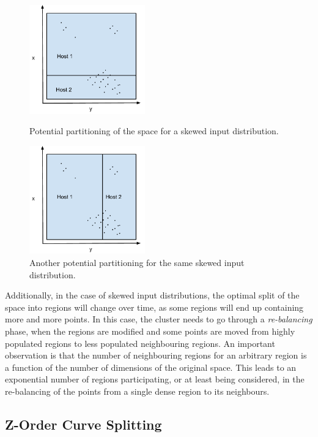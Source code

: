 \documentclass[11pt,a4paper]{globis-book}
\begin{document}
\begin{figure}[t]
\centering
\parbox{5cm}{
    \includegraphics[width=5cm]{images/geometric-bad-split}
    \caption{Potential partitioning of the space for a skewed input distribution.}
    \label{fig:geometric-bad-split}}
\qquad
\begin{minipage}{5cm}
    \includegraphics[width=5cm]{images/geometric-bad-split-2}
    \caption{Another potential partitioning for the same skewed input distribution.}
    \label{fig:geometric-bad-split-2}
\end{minipage}
\end{figure}
        
Additionally, in the case of skewed input distributions, the optimal split of the space into regions will change over time, as some regions will end up containing more and more points. In this case, the cluster needs to go through a \textit{re-balancing} phase, when the regions are modified and some points are moved from highly populated regions to less populated neighbouring regions. An important observation is that the number of neighbouring regions for an arbitrary region is a function of the number of dimensions of the original space. This leads to an exponential number of regions participating, or at least being considered, in the re-balancing of the points from a single dense region to its neighbours. 

\subsection{Z-Order Curve Splitting}
\end{document}
